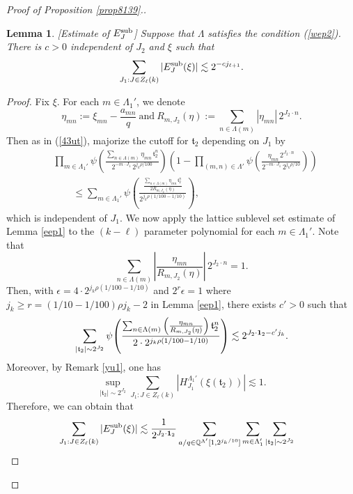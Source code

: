 \documentclass[11 pt,letterpaper]{amsart}
\theoremstyle{plain}
\newtheorem{lemma}{Lemma}\numberwithin{lemma}{section}
\theoremstyle{definition}
\theoremstyle{remark} \theoremstyle{exam} \theoremstyle{ob}
\numberwithin{equation}{section}
\begin{document}
\begin{proof}[Proof of Proposition \ref{prop8139}.]
\begin{lemma}\label{lem57b9}[Estimate of $E_J^{\rm{sub}}$] Suppose that $\Lambda$ satisfies   the  condition (\ref{wep2}). There is $c>0$ independent of $J_2$ and $\xi$ such that 
\begin{align*}
	\sum_{J_1:J\in Z_{\ell}(k)} |E^{\rm{sub}}_J(\xi)| \lesssim 2^{-cj_{\ell+1}}.
\end{align*}
\end{lemma}
\begin{proof}
Fix $\xi$. For each $m\in \Lambda_1'$,  we denote
	$$\eta_{mn}:=\xi_{mn}-\frac{a_{mn}}{q}\ \text{and}\ R_{m,J_2}(\eta):=\sum_{n\in\Lambda(m)} |\eta_{mn}|\, 2^{J_2 \cdot n}. $$ Then as in (\ref{43ut}), majorize the cutoff for $\mathfrak{t}_2$ depending on $J_1$ by  
	\begin{align*} 
		&\prod_{m\in\Lambda_1'}
		\psi\!\left(
		\frac{\sum_{n\in\Lambda(m)} \eta_{mn}\, \mathfrak{t}_2^n}
		{2^{-m\cdot J_1}\, 2^{j_{k}\rho /100}}
		\right)
		\left(
		1-
		\prod_{(m,n)\in\Lambda'}
		\psi\!\left(
		\frac{\eta_{mn}\, 2^{J_2\cdot n}}
		{2^{-m\cdot  J_1}\, 2^{j_k\rho /10}}
		\right)
		\right) \\
&\qquad \le
		\sum_{m\in\Lambda_1'}
		\psi\!\left(
		\frac{
			\displaystyle
			\frac{\sum_{n\in\Lambda(m)} \eta_{mn}\, \mathfrak{t}_2^n}
			{2R_{m,J_2}(\eta)}
		}
		{ 2^{j_k\rho  (1/100-1/10)}}
		\right),\nonumber
	\end{align*}
	which is independent of $J_1$. 
We now apply the lattice sublevel set estimate of Lemma \ref{eep1} to the $(k-\ell)$ parameter polynomial for  each  $m\in \Lambda_1'$. Note that $$ \sum_{n\in\Lambda(m)} \left|\frac{\eta_{mn}}{R_{m,J_2}(\eta)}\right| \, 2^{J_2\cdot n}=1.$$ Then,
	with $\epsilon=4\cdot 2^{j_k\rho  (1/100-1/10)} $  and $2^r\epsilon =1$ where $j_k\ge r=(1/10-1/100)\rho  j_k-2$ in Lemma \ref{eep1},  there exists $c'>0$ such that
	$$ \sum_{|\mathfrak{t}_2|\sim 2^{J_2}}   
	\psi\!\left(
	\frac{
		\sum_{n\in\Lambda(m)} \left(\frac{\eta_{mn}}{R_{m,J_2}(\eta)} \right)\mathfrak{t}_2^n
	}
	{ 2\cdot 2^{j_k \rho  (1/100-1/10)}}
	\right)\lesssim 2^{J_2\cdot {\bf 1}_2- c' j_k}. $$ Moreover, by Remark \ref{yu1}, one has $$ \sup_{|\mathfrak{t}_2|\sim 2^{J_2}} \sum_{J_1:J\in Z_\ell(k)}\left| H^{\Lambda_{1}'}_{J_{1}}\left(\xi(\mathfrak{t}_2) \right)\right|\lesssim 1.$$ Therefore,    we can obtain that
	\begin{align*}
	\sum_{J_1:J\in Z_{\ell}(k)} |E^{\rm{sub}}_J(\xi)| &\lesssim  \frac{1}{2^{J_2\cdot {\bf 1}_2}}
	 \sum_{ a/q\in \mathbb{Q}^{\Lambda'}[1,2^{j_k/10}]}  	\sum_{m\in\Lambda_1'} \sum_{|\mathfrak{t}_2|\sim  2^{J_2}}    

\end{align*}
\end{proof}
\end{proof}
\end{document}
